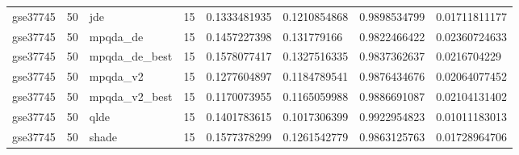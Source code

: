 \begin{table}[t]
\begin{tabular}{llllllll}
gse37745 & 50 & jde & 15 & 0.1333481935 & 0.1210854868 & 0.9898534799 & 0.01711811177 \\
gse37745 & 50 & mpqda\_de & 15 & 0.1457227398 & 0.131779166 & 0.9822466422 & 0.02360724633 \\
gse37745 & 50 & mpqda\_de\_best & 15 & 0.1578077417 & 0.1327516335 & 0.9837362637 & 0.0216704229 \\
gse37745 & 50 & mpqda\_v2 & 15 & 0.1277604897 & 0.1184789541 & 0.9876434676 & 0.02064077452 \\
gse37745 & 50 & mpqda\_v2\_best & 15 & 0.1170073955 & 0.1165059988 & 0.9886691087 & 0.02104131402 \\
gse37745 & 50 & qlde & 15 & 0.1401783615 & 0.1017306399 & 0.9922954823 & 0.01011183013 \\
gse37745 & 50 & shade & 15 & 0.1577378299 & 0.1261542779 & 0.9863125763 & 0.01728964706 \\
\hline
\end{tabular}
\end{table}
